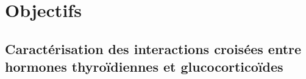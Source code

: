 \documentclass[../main.tex]{subfiles}
\begin{document}




\section{Objectifs}


\subsection{Caractérisation des interactions croisées entre hormones thyroïdiennes et glucocorticoïdes}
\end{document}
